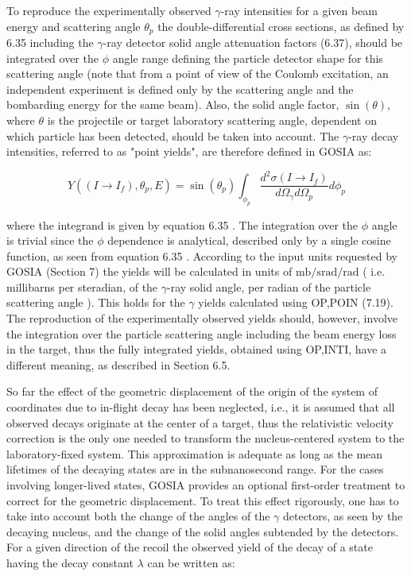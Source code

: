 \documentclass[10pt]{article}
\begin{document}
To reproduce the experimentally observed $\gamma$-ray intensities for a given beam energy and scattering angle $\theta_{p}$ the double-differential cross sections, as defined by 6.35 including the $\gamma$-ray detector solid angle attenuation factors (6.37), should be integrated over the $\phi$ angle range defining the particle detector shape for this scattering angle (note that from a point of view of the Coulomb excitation, an independent experiment is defined only by the scattering angle and the bombarding energy for the same beam). Also, the solid angle factor, $\sin (\theta)$, where $\theta$ is the projectile or target laboratory scattering angle, dependent on which particle has been detected, should be taken into account. The $\gamma$-ray decay intensities, referred to as "point yields", are therefore defined in GOSIA as:


\begin{equation*}
Y\left(\left(I \rightarrow I_{f}\right), \theta_{p}, E\right)=\sin \left(\theta_{p}\right) \int_{\phi_{p}} \frac{d^{2} \sigma\left(I \rightarrow I_{f}\right)}{d \Omega_{\gamma} d \Omega_{p}} d \phi_{p} \tag{6.38}
\end{equation*}


where the integrand is given by equation 6.35 . The integration over the $\phi$ angle is trivial since the $\phi$ dependence is analytical, described only by a single cosine function, as seen from equation 6.35 . According to the input units requested by GOSIA (Section 7) the yields will be calculated in units of $\mathrm{mb} / \mathrm{srad} / \mathrm{rad}$ ( i.e. millibarns per steradian, of the $\gamma$-ray solid angle, per radian of the particle scattering angle ). This holds for the $\gamma$ yields calculated using OP,POIN (7.19). The reproduction of the experimentally observed yields should, however, involve the integration over the particle scattering angle including the beam energy loss in the target, thus the fully integrated yields, obtained using OP,INTI, have a different meaning, as described in Section 6.5.

So far the effect of the geometric displacement of the origin of the system of coordinates due to in-flight decay has been neglected, i.e., it is assumed that all observed decays originate at the center of a target, thus the relativistic velocity correction is the only one needed to transform the nucleus-centered system to the laboratory-fixed system. This approximation is adequate as long as the mean lifetimes of the decaying states are in the subnanosecond range. For the cases involving longer-lived states, GOSIA provides an optional first-order treatment to correct for the geometric displacement. To treat this effect rigorously, one has to take into account both the change of the angles of the $\gamma$ detectors, as seen by the decaying nucleus, and the change of the solid angles subtended by the detectors. For a given direction of the recoil the observed yield of the decay of a state having the decay constant $\lambda$ can be written as:
\end{document}
